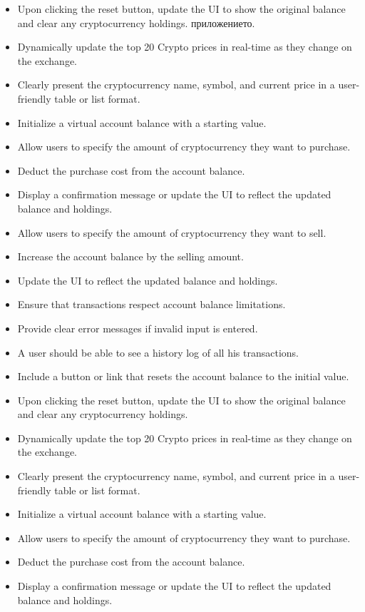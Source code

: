 \documentclass[a4paper,12pt]{article}
\begin{document}
\begin{itemize}
    \item Upon clicking the reset button, update the UI to show the original balance and clear any cryptocurrency holdings. приложението.
    \item Dynamically update the top 20 Crypto prices in real-time as they change on the exchange.
    \item Clearly present the cryptocurrency name, symbol, and current price in a user-friendly table or list format.
    \item Initialize a virtual account balance with a starting value.
    \item Allow users to specify the amount of cryptocurrency they want to purchase.
    \item Deduct the purchase cost from the account balance.
    \item Display a confirmation message or update the UI to reflect the updated balance and holdings.
    \item Allow users to specify the amount of cryptocurrency they want to sell.
    \item Increase the account balance by the selling amount.
    \item Update the UI to reflect the updated balance and holdings.
    \item Ensure that transactions respect account balance limitations.
    \item Provide clear error messages if invalid input is entered.
    \item A user should be able to see a history log of all his transactions.
    \item Include a button or link that resets the account balance to the initial value.
    \item Upon clicking the reset button, update the UI to show the original balance and clear any cryptocurrency holdings.
    \item Dynamically update the top 20 Crypto prices in real-time as they change on the exchange.
    \item Clearly present the cryptocurrency name, symbol, and current price in a user-friendly table or list format.
    \item Initialize a virtual account balance with a starting value.
    \item Allow users to specify the amount of cryptocurrency they want to purchase.
    \item Deduct the purchase cost from the account balance.
    \item Display a confirmation message or update the UI to reflect the updated balance and holdings.

\end{itemize}
\end{document}
